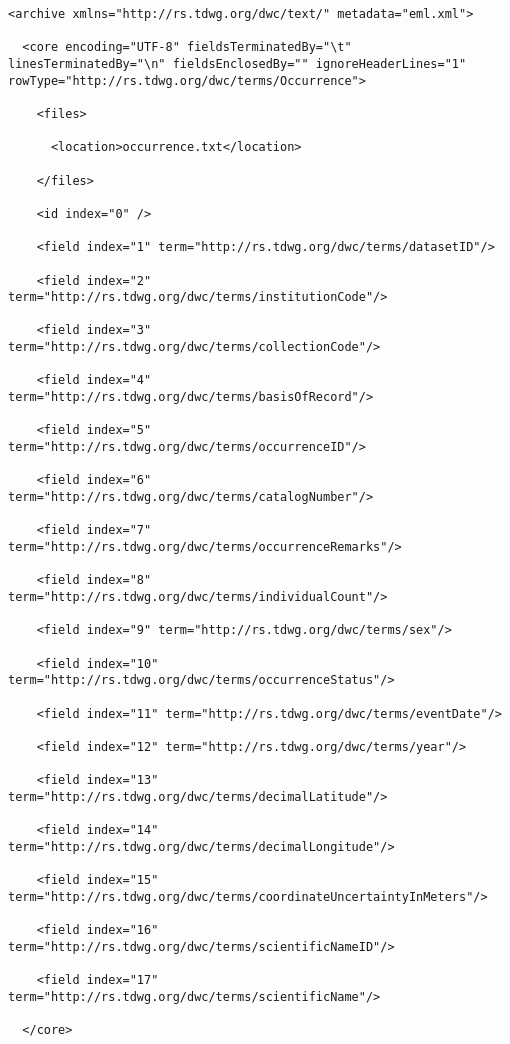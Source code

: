 \documentclass[
]{book}
\begin{document}
\begin{verbatim}
<archive xmlns="http://rs.tdwg.org/dwc/text/" metadata="eml.xml">

  <core encoding="UTF-8" fieldsTerminatedBy="\t" linesTerminatedBy="\n" fieldsEnclosedBy="" ignoreHeaderLines="1" rowType="http://rs.tdwg.org/dwc/terms/Occurrence">

    <files>

      <location>occurrence.txt</location>

    </files>

    <id index="0" />

    <field index="1" term="http://rs.tdwg.org/dwc/terms/datasetID"/>

    <field index="2" term="http://rs.tdwg.org/dwc/terms/institutionCode"/>

    <field index="3" term="http://rs.tdwg.org/dwc/terms/collectionCode"/>

    <field index="4" term="http://rs.tdwg.org/dwc/terms/basisOfRecord"/>

    <field index="5" term="http://rs.tdwg.org/dwc/terms/occurrenceID"/>

    <field index="6" term="http://rs.tdwg.org/dwc/terms/catalogNumber"/>

    <field index="7" term="http://rs.tdwg.org/dwc/terms/occurrenceRemarks"/>

    <field index="8" term="http://rs.tdwg.org/dwc/terms/individualCount"/>

    <field index="9" term="http://rs.tdwg.org/dwc/terms/sex"/>

    <field index="10" term="http://rs.tdwg.org/dwc/terms/occurrenceStatus"/>

    <field index="11" term="http://rs.tdwg.org/dwc/terms/eventDate"/>

    <field index="12" term="http://rs.tdwg.org/dwc/terms/year"/>

    <field index="13" term="http://rs.tdwg.org/dwc/terms/decimalLatitude"/>

    <field index="14" term="http://rs.tdwg.org/dwc/terms/decimalLongitude"/>

    <field index="15" term="http://rs.tdwg.org/dwc/terms/coordinateUncertaintyInMeters"/>

    <field index="16" term="http://rs.tdwg.org/dwc/terms/scientificNameID"/>

    <field index="17" term="http://rs.tdwg.org/dwc/terms/scientificName"/>

  </core>


\end{verbatim}
\end{document}
